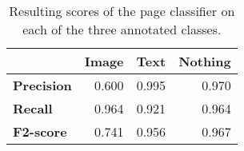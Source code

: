 \begin{table}[h]
\centering
\begin{tabular}{l r r r}
\hline
  & \textbf{Image} & \textbf{Text} & \textbf{Nothing} \\\hline
\textbf{Precision} & 0.600  & 0.995 & 0.970 \\
\textbf{Recall} & 0.964  & 0.921 & 0.964 \\
\textbf{F2-score} & 0.741 & 0.956 & 0.967 \\\hline
\end{tabular}
\caption{Resulting scores of the page classifier on each of the three annotated
classes.}
\label{tab:pageclasresults}
\end{table}


